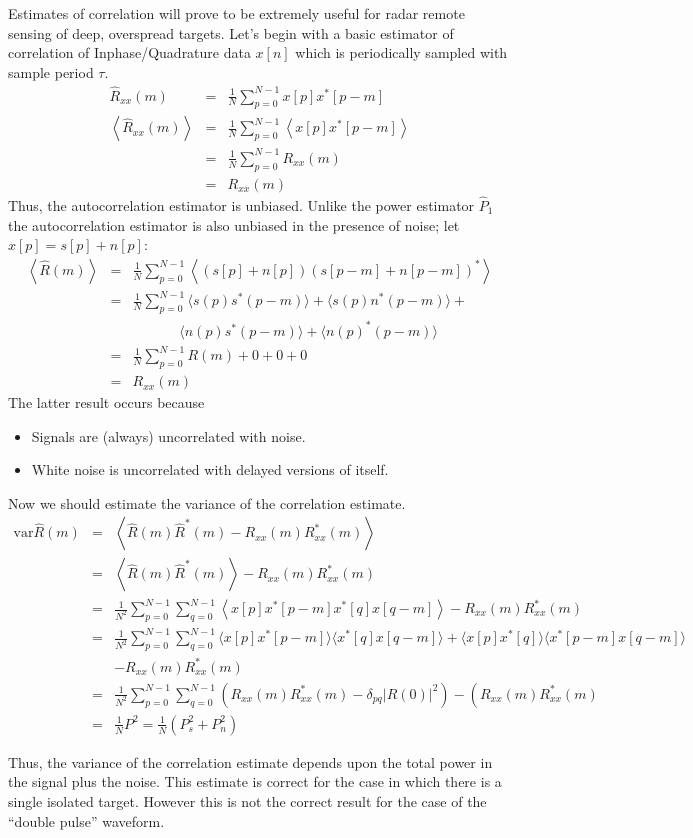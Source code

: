 Estimates of correlation will prove to be extremely useful for radar
remote sensing of deep, overspread targets.  Let's begin with a basic
estimator of correlation of Inphase/Quadrature data $x[n]$ which is
periodically sampled with sample period $\tau$.
\begin{eqnarray}
\hat{R}_{xx}(m) &=& \frac{1}{N} \sum_{p=0}^{N-1} x[p] x^\ast[p-m] \\
\left\langle \hat{R}_{xx}(m) \right\rangle &=& \frac{1}{N}
\sum_{p=0}^{N-1} \left\langle x[p] x^\ast[p-m] \right\rangle \\
&=& \frac{1}{N} \sum_{p=0}^{N-1} R_{xx}(m) \\
&=& R_{xx}(m)
\end{eqnarray}
Thus, the autocorrelation estimator is unbiased.  Unlike the power
estimator $\hat{P}_1$ the autocorrelation estimator is also unbiased
in the presence of noise; let $x[p] = s[p] + n[p]$:
\begin{eqnarray}
\left\langle \hat{R}(m) \right\rangle &=& \frac{1}{N}
\sum_{p=0}^{N-1} \left\langle (s[p] + n[p]) (s[p-m] + n[p-m])^\ast \right\rangle \\
&=& \frac{1}{N} \sum_{p=0}^{N-1} \langle s(p)s^\ast(p-m)\rangle
+\langle s(p)n^\ast(p-m)\rangle +  \\ \nonumber 
& & \;\;\;\;\;\;\;\;\;\;\;\;\langle n(p)s^\ast(p-m)\rangle +\langle n(p)^\ast(p-m)\rangle\\
&=&  \frac{1}{N} \sum_{p=0}^{N-1} R(m) + 0 + 0 + 0 \\
&=& R_{xx}(m)
\end{eqnarray}
The latter result occurs because
\begin{itemize}
\item Signals are (always) uncorrelated with noise.
\item White noise is uncorrelated with delayed versions of itself.
\end{itemize}

Now we should estimate the variance of the correlation estimate.
\begin{eqnarray}
\textrm{var}\hat{R}(m) &=& \left\langle \hat{R}(m)\hat{R}^\ast(m) -
  R_{xx}(m) R^\ast_{xx}(m)\right\rangle \\
&=& \left\langle \hat{R}(m)\hat{R}^\ast(m) \right\rangle - R_{xx}(m)
R^\ast_{xx}(m) \\
&=& \frac{1}{N^2}
\sum_{p=0}^{N-1}\sum_{q=0}^{N-1} \left\langle x[p] x^\ast[p-m]
  x^\ast[q] x[q-m] \right\rangle - R_{xx}(m) R^\ast_{xx}(m) \\
&=& \frac{1}{N^2}\sum_{p=0}^{N-1}\sum_{q=0}^{N-1} \langle x[p]
x^\ast[p-m]\rangle\langle x^\ast[q] x[q-m] \rangle +\langle x[p]
x^\ast[q]\rangle\langle x^\ast[p-m] x[q-m] \rangle \nonumber \\
& &- R_{xx}(m) R^\ast_{xx}(m) \\
&=&  \frac{1}{N^2}\sum_{p=0}^{N-1}\sum_{q=0}^{N-1}  \left(R_{xx}(m)
R^\ast_{xx}(m) - \delta_{pq} |R(0)|^2\right) -  \left(R_{xx}(m)
R^\ast_{xx}(m) \\
&=& \frac{1}{N}P^2 = \frac{1}{N} \left(P_s^2 + P_n^2\right)
\end{eqnarray}

Thus, the variance of the correlation estimate depends upon the total
power in the signal plus the noise.  This estimate is correct for the
case in which there is a single isolated target.  However this is not
the correct result for the case of the ``double pulse'' waveform.